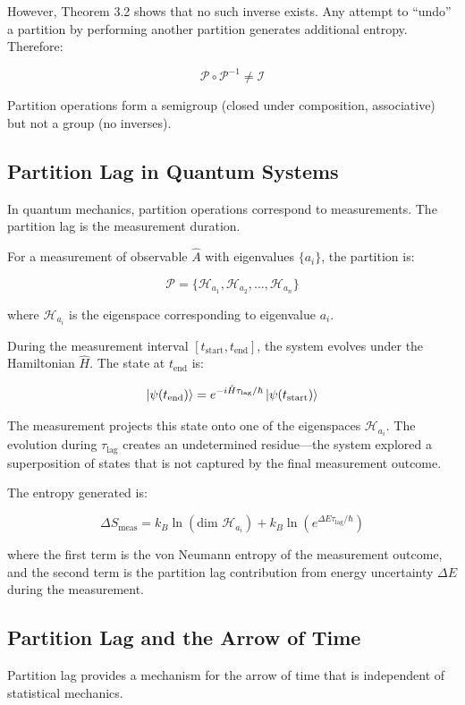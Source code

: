 \documentclass[twocolumn,10pt]{article}
\theoremstyle{definition}
\theoremstyle{remark}
\begin{document}
However, Theorem 3.2 shows that no such inverse exists. Any attempt to ``undo'' a partition by performing another partition generates additional entropy. Therefore:

$$
\mathcal{P} \circ \mathcal{P}^{-1} \neq \mathcal{I}
$$

Partition operations form a semigroup (closed under composition, associative) but not a group (no inverses).

\subsection{Partition Lag in Quantum Systems}

In quantum mechanics, partition operations correspond to measurements. The partition lag is the measurement duration.

For a measurement of observable $\hat{A}$ with eigenvalues $\{a_i\}$, the partition is:

$$
\mathcal{P} = \{\mathcal{H}_{a_1}, \mathcal{H}_{a_2}, \ldots, \mathcal{H}_{a_n}\}
$$

where $\mathcal{H}_{a_i}$ is the eigenspace corresponding to eigenvalue $a_i$.

During the measurement interval $[t_{\text{start}}, t_{\text{end}}]$, the system evolves under the Hamiltonian $\hat{H}$. The state at $t_{\text{end}}$ is:

$$
\ket{\psi(t_{\text{end}})} = e^{-i\hat{H}\tau_{\text{lag}}/\hbar} \ket{\psi(t_{\text{start}})}
$$

The measurement projects this state onto one of the eigenspaces $\mathcal{H}_{a_i}$. The evolution during $\tau_{\text{lag}}$ creates an undetermined residue—the system explored a superposition of states that is not captured by the final measurement outcome.

The entropy generated is:

$$
\Delta S_{\text{meas}} = k_B \ln(\text{dim } \mathcal{H}_{a_i}) + k_B \ln(e^{\Delta E \tau_{\text{lag}}/\hbar})
$$

where the first term is the von Neumann entropy of the measurement outcome, and the second term is the partition lag contribution from energy uncertainty $\Delta E$ during the measurement.

\subsection{Partition Lag and the Arrow of Time}

Partition lag provides a mechanism for the arrow of time that is independent of statistical mechanics.
\end{document}
